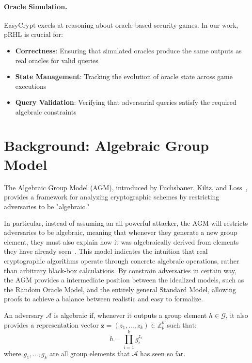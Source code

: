 \paragraph{Oracle Simulation.} EasyCrypt excels at reasoning about oracle-based security games. In our work, pRHL is crucial for:
\begin{itemize}
\item \textbf{Correctness}: Ensuring that simulated oracles produce the same outputs as real oracles for valid queries
\item \textbf{State Management}: Tracking the evolution of oracle state across game executions  
\item \textbf{Query Validation}: Verifying that adversarial queries satisfy the required algebraic constraints
\end{itemize}



\section{Background: Algebraic Group Model}
\label{sec:agm-background}

The Algebraic Group Model (AGM), introduced by Fuchsbauer, Kiltz, and Loss~\cite{fuchsbauer2018}, provides a framework for analyzing cryptographic schemes by restricting adversaries to be "algebraic."

In particular, instead of assuming an all-powerful attacker, the AGM will restricts adversaries to be algebraic, meaning that whenever they generate a new group element, they must also explain how it was algebraically derived from elements they have already seen~\cite{cong2022}. This model indicates the intuition that real cryptographic algorithms operate through concrete algebraic operations, rather than arbitrary black-box calculations.
By constrain adversaries in certain way, the AGM provides a intermediate position between the idealized models, such as the Random Oracle Model, and the entirely general Standard Model, allowing proofs to achieve a balance between realistic and easy to formalize.

\begin{definition}
\label{def:algebraic-adversary}
An adversary $\mathcal{A}$ is algebraic if, whenever it outputs a group element $h \in \mathcal{G}$, it also provides a representation vector $\mathbf{z} = (z_1, \ldots, z_k) \in \mathbb{Z}_p^k$ such that:
\[
h = \prod_{i=1}^k g_i^{z_i}
\]
where $g_1, \ldots, g_k$ are all group elements that $\mathcal{A}$ has seen so far.
\end{definition}

